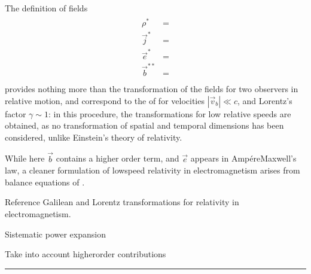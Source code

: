 \documentclass[letterpaper,10pt,english]{jupyterBook}
\begin{document}
\sphinxAtStartPar
The definition of fields
\begin{equation*}
\begin{split}\begin{aligned}
     \rho^*     & = \\
  \vec{j}^*     & = \\
  \vec{e}^*     & = \\
  \vec{b}^{* *} & = \\
\end{aligned}\end{split}
\end{equation*}
\sphinxAtStartPar
provides nothing more than the transformation of the fields for two observers in relative motion, and correspond to the  of  for velocities \(|\vec{v}_b| \ll c\), and Lorentz’s factor \(\gamma \sim 1\): in this procedure, the transformations for low relative speeds are obtained, as no transformation of spatial and temporal dimensions has been considered, unlike Einstein’s theory of relativity.

\sphinxAtStartPar
While here \(\vec{b}\) contains a higher order term, and \(\vec{e}\) appears in Ampére\sphinxhyphen{}Maxwell’s law, a cleaner formulation of low\sphinxhyphen{}speed relativity in electromagnetism arises from balance equations of {\hyperref[\detokenize{ch/principles-matter:classical-electromagnetism-principles-matter}]{}}.

\sphinxAtStartPar
{} Reference Galilean and Lorentz transformations for relativity in electromagnetism.

\sphinxAtStartPar
{} Sistematic power expansion

\sphinxAtStartPar
{} Take into account higher\sphinxhyphen{}order contributions




\bigskip\hrule\bigskip


\sphinxstepscope
\end{document}
